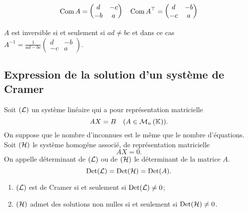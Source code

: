 \begin{equation}
  \operatorname{Com} A =
  \begin{pmatrix}
    d & -c \\ 
    -b & a 
  \end{pmatrix} 
  \quad {\operatorname{Com}A}^{\top} = 
  \begin{pmatrix} 
    d & -b \\ 
    -c & a 
  \end{pmatrix}
\end{equation}

\(A\) est inversible si et seulement si \(ad \neq bc\) et dans ce cas 
\(A^{-1} = \frac{1}{ad-bc} 
\begin{pmatrix}
  d & -b \\ 
  -c & a
\end{pmatrix}
\).

\subsection{Expression de la solution d'un système de Cramer}

Soit \((\mathcal{L})\) un système linéaire qui a pour représentation matricielle
\begin{equation}
  AX=B \quad (A \in \mathcal{M}_{n}\left(\mathbb{K}\right)).
\end{equation}
On suppose que le nombre d'inconnues est le même que le nombre 
d'équations. Soit \((\mathcal{H})\) le système homogéne associé, de 
représentation matricielle
\begin{equation}
  AX=0.
\end{equation}
On appelle déterminant de \((\mathcal{L})\) ou de \((\mathcal{H})\) le déterminant de la 
matrice \(A\).
\begin{equation}
  \operatorname{Det}(\mathcal{L})=\operatorname{Det}(\mathcal{H})=\operatorname{Det}(A).
\end{equation}

\begin{prop}
  \begin{enumerate}
    \item \((\mathcal{L})\) est de Cramer si et seulement si \(\operatorname{Det}(\mathcal{L}) \neq 
      0\);
    \item \((\mathcal{H})\) admet des solutions non nulles si et seulement si 
      \(\operatorname{Det}(\mathcal{H}) \neq 0\).
  \end{enumerate}
\end{prop}


